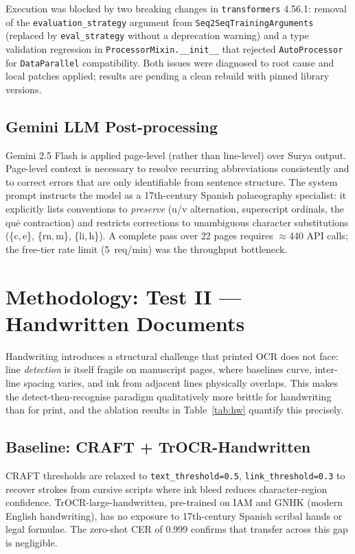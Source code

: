 \documentclass[11pt,a4paper]{article}
\begin{document}
Execution was blocked by two breaking changes in \texttt{transformers} 4.56.1: removal of
the \texttt{evaluation\_strategy} argument from \texttt{Seq2SeqTrainingArguments} (replaced
by \texttt{eval\_strategy} without a deprecation warning) and a type validation regression
in \texttt{ProcessorMixin.\_\_init\_\_} that rejected \texttt{AutoProcessor} for
\texttt{DataParallel} compatibility. Both issues were diagnosed to root cause and local
patches applied; results are pending a clean rebuild with pinned library versions.

\subsection{Gemini LLM Post-processing}

Gemini 2.5 Flash \cite{gemini2024} is applied page-level (rather than line-level) over
Surya output. Page-level context is necessary to resolve recurring abbreviations
consistently and to correct errors that are only identifiable from sentence structure.
The system prompt instructs the model as a 17th-century Spanish palaeography specialist:
it explicitly lists conventions to \emph{preserve} (u/v alternation, superscript ordinals,
the qu\={e} contraction) and restricts corrections to unambiguous character substitutions
(\{c,\,e\}, \{rn,\,m\}, \{li,\,h\}). A complete pass over 22 pages requires $\approx$440
API calls; the free-tier rate limit (5~req/min) was the throughput bottleneck.

\section{Methodology: Test II --- Handwritten Documents}

Handwriting introduces a structural challenge that printed OCR does not face: line
\emph{detection} is itself fragile on manuscript pages, where baselines curve, inter-line
spacing varies, and ink from adjacent lines physically overlaps. This makes the
detect-then-recognise paradigm qualitatively more brittle for handwriting than for print,
and the ablation results in Table~\ref{tab:hw} quantify this precisely.

\subsection{Baseline: CRAFT + TrOCR-Handwritten}

CRAFT thresholds are relaxed to \texttt{text\_threshold=0.5}, \texttt{link\_threshold=0.3}
to recover strokes from cursive scripts where ink bleed reduces character-region confidence.
TrOCR-large-handwritten, pre-trained on IAM and GNHK (modern English handwriting), has no
exposure to 17th-century Spanish scribal hands or legal formulae. The zero-shot CER of 0.999
confirms that transfer across this gap is negligible.
\end{document}
